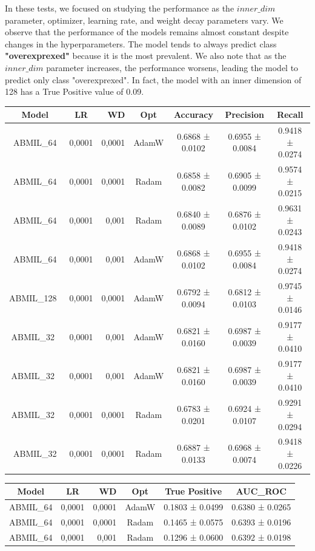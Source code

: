 \documentclass{article}
\begin{document}
In these tests, we focused on studying the performance as the $inner\_dim$ parameter, optimizer, learning rate, and weight decay parameters vary. We observe that the performance of the models remains almost constant despite changes in the hyperparameters. The model tends to always predict class \textbf{"overexprexed"}  because it is the most prevalent. We also note that as the $inner\_dim$ parameter increases, the performance worsens, leading the model to predict only class "overexprexed". In fact, the model with an inner dimension of 128 has a True Positive value of 0.09.

\begin{table}[h]
	\centering
	\begin{tabular}{|ccrc|c|c|c|}
		\hline
		Model & LR & WD & Opt & Accuracy & Precision & Recall\\
		\hline
		ABMIL\_64 & 0,0001 & 0,0001 & AdamW & 0.6868 ± 0.0102 & 0.6955 ± 0.0084 & 0.9418 ± 0.0274 \\
		ABMIL\_64 & 0,0001 & 0,0001 & Radam & 0.6858 ± 0.0082 & 0.6905 ± 0.0099 & 0.9574 ± 0.0215 \\
		ABMIL\_64 & 0,0001 & 0,001 & Radam & 0.6840 ± 0.0089 & 0.6876 ± 0.0102 & 0.9631 ± 0.0243\\
		ABMIL\_64 & 0,0001 & 0,001 & AdamW & 0.6868 ± 0.0102 & 0.6955 ± 0.0084 & 0.9418 ± 0.0274\\
		ABMIL\_128\ & 0,0001 & 0,0001 & AdamW & 0.6792 ± 0.0094 & 0.6812 ± 0.0103 & 0.9745 ± 0.0146 \\
		ABMIL\_32\ & 0,0001 & 0,001 & AdamW & 0.6821 ± 0.0160 & 0.6987 ± 0.0039 & 0.9177 ± 0.0410 \\
		ABMIL\_32\ & 0,0001 & 0,001 & AdamW & 0.6821 ± 0.0160 & 0.6987 ± 0.0039 & 0.9177 ± 0.0410\\
		ABMIL\_32\ & 0,0001 & 0,0001 & Radam & 0.6783 ± 0.0201 & 0.6924 ± 0.0107 & 0.9291 ± 0.0294\\
		ABMIL\_32 & 0,0001 & 0,0001 & Radam & 0.6887 ± 0.0133 & 0.6968 ± 0.0074 & 0.9418 ± 0.0226\\
		\hline
	\end{tabular}
	\centering
	\begin{tabular}{|ccrc|c|c|}
		\hline
		Model & LR & WD & Opt & True Positive & AUC\_ROC\\
		\hline
		ABMIL\_64 & 0,0001 & 0,0001 & AdamW & 0.1803 ± 0.0499 &0.6380 ± 0.0265  \\
		ABMIL\_64 & 0,0001 & 0,0001 & Radam & 0.1465 ± 0.0575& 0.6393 ± 0.0196\\
		ABMIL\_64 & 0,0001 & 0,001 & Radam & 0.1296 ± 0.0600 & 0.6392 ± 0.0198\\

\end{tabular}
\end{table}
\end{document}
